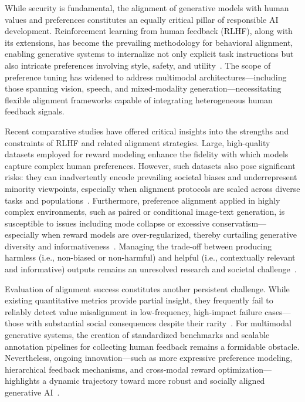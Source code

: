 \documentclass[11pt]{article}
\begin{document}
While security is fundamental, the alignment of generative models with human values and preferences constitutes an equally critical pillar of responsible AI development. Reinforcement learning from human feedback (RLHF), along with its extensions, has become the prevailing methodology for behavioral alignment, enabling generative systems to internalize not only explicit task instructions but also intricate preferences involving style, safety, and utility~\cite{ref69, ref75}. The scope of preference tuning has widened to address multimodal architectures—including those spanning vision, speech, and mixed-modality generation—necessitating flexible alignment frameworks capable of integrating heterogeneous human feedback signals.

Recent comparative studies have offered critical insights into the strengths and constraints of RLHF and related alignment strategies. Large, high-quality datasets employed for reward modeling enhance the fidelity with which models capture complex human preferences. However, such datasets also pose significant risks: they can inadvertently encode prevailing societal biases and underrepresent minority viewpoints, especially when alignment protocols are scaled across diverse tasks and populations~\cite{ref69}. Furthermore, preference alignment applied in highly complex environments, such as paired or conditional image-text generation, is susceptible to issues including mode collapse or excessive conservatism—especially when reward models are over-regularized, thereby curtailing generative diversity and informativeness~\cite{ref75}. Managing the trade-off between producing harmless (i.e., non-biased or non-harmful) and helpful (i.e., contextually relevant and informative) outputs remains an unresolved research and societal challenge~\cite{ref75}.

Evaluation of alignment success constitutes another persistent challenge. While existing quantitative metrics provide partial insight, they frequently fail to reliably detect value misalignment in low-frequency, high-impact failure cases—those with substantial social consequences despite their rarity~\cite{ref75}. For multimodal generative systems, the creation of standardized benchmarks and scalable annotation pipelines for collecting human feedback remains a formidable obstacle. Nevertheless, ongoing innovation—such as more expressive preference modeling, hierarchical feedback mechanisms, and cross-modal reward optimization—highlights a dynamic trajectory toward more robust and socially aligned generative AI~\cite{ref69, ref75}.
\end{document}
